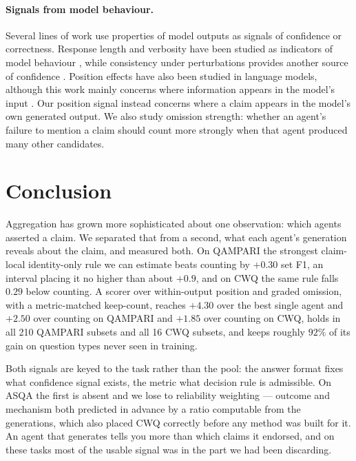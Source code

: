 \documentclass{article}
\begin{document}
\paragraph{Signals from model behaviour.}
Several lines of work use properties of model outputs as signals of confidence or correctness. Response length and verbosity have been studied as indicators of model behaviour \cite{janiak2025illusion,zhang2024verbosity}, while consistency under perturbations provides another source of confidence \cite{wu2026this,ahn2025prompt}. Position effects have also been studied in language models, although this work mainly concerns where information appears in the model's input \cite{guo2024serial,zhang2026position,salvatore2025lost,qiao2026llm,yan2026evirank}. Our position signal instead concerns where a claim appears in the model's own generated output. We also study omission strength: whether an agent's failure to mention a claim should count more strongly when that agent produced many other candidates.



\section{Conclusion}
\label{sec:conclusion}

Aggregation has grown more sophisticated about one observation: which agents asserted a claim. We separated that from a second, what each agent's generation reveals about the claim, and measured both. On QAMPARI the strongest claim-local identity-only rule we can estimate beats counting by $+0.30$ set F1, an interval placing it no higher than about $+0.9$, and on CWQ the same rule falls $0.29$ below counting. A scorer over within-output position and graded omission, with a metric-matched keep-count, reaches $+4.30$ over the best single agent and $+2.50$ over counting on QAMPARI and $+1.85$ over counting on CWQ, holds in all 210 QAMPARI subsets and all 16 CWQ subsets, and keeps roughly $92\%$ of its gain on question types never seen in training.

Both signals are keyed to the task rather than the pool: the answer format fixes what confidence signal exists, the metric what decision rule is admissible. On ASQA the first is absent and we lose to reliability weighting --- outcome and mechanism both predicted in advance by a ratio computable from the generations, which also placed CWQ correctly before any method was built for it. An agent that generates tells you more than which claims it endorsed, and on these tasks most of the usable signal was in the part we had been discarding.
\end{document}
